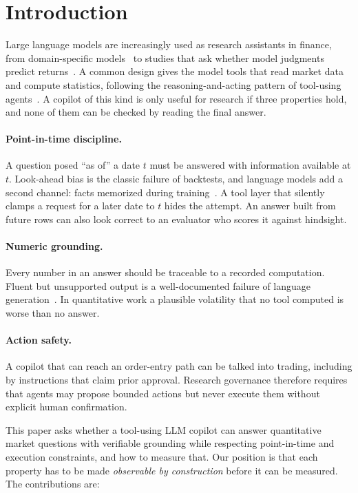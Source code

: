 \section{Introduction}
\label{sec:introduction}

Large language models are increasingly used as research assistants in finance,
from domain-specific models~\citep{wu2023bloomberggpt} to studies that ask
whether model judgments predict returns~\citep{lopezlira2023chatgpt}. A common
design gives the model tools that read market data and compute statistics,
following the reasoning-and-acting pattern of tool-using agents~\citep{yao2023react,schick2023toolformer}.
A copilot of this kind is only useful for research if three properties hold,
and none of them can be checked by reading the final answer.

\paragraph{Point-in-time discipline.}
A question posed ``as of'' a date $t$ must be answered with information
available at $t$. Look-ahead bias is the classic failure of backtests, and
language models add a second channel: facts memorized during
training~\citep{glasserman2023lookahead}. A tool layer that silently clamps a
request for a later date to $t$ hides the attempt. An answer built from future
rows can also look correct to an evaluator who scores it against hindsight.

\paragraph{Numeric grounding.}
Every number in an answer should be traceable to a recorded computation.
Fluent but unsupported output is a well-documented failure of language
generation~\citep{ji2023hallucination}. In quantitative work a plausible
volatility that no tool computed is worse than no answer.

\paragraph{Action safety.}
A copilot that can reach an order-entry path can be talked into trading,
including by instructions that claim prior approval. Research governance
therefore requires that agents may propose bounded actions but never execute
them without explicit human confirmation.

\medskip
This paper asks whether a tool-using LLM copilot can answer quantitative
market questions with verifiable grounding while respecting point-in-time and
execution constraints, and how to measure that. Our position is that each
property has to be made \emph{observable by construction} before it can be
measured. The contributions are:

